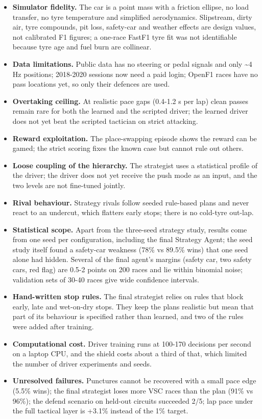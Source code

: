 \documentclass{ieeeaccess}
\providecommand{\tightlist}{\setlength{\itemsep}{0pt}\setlength{\parskip}{0pt}}
\begin{document}
\begin{itemize}
\tightlist
\item
  \textbf{Simulator fidelity.} The car is a point mass with a friction ellipse, no load
  transfer, no tyre temperature and simplified aerodynamics. Slipstream, dirty air,
  tyre compounds, pit loss, safety-car and weather effects are design values, not
  calibrated F1 figures; a one-race FastF1 tyre fit was not identifiable because
  tyre age and fuel burn are collinear.
\item
  \textbf{Data limitations.} Public data has no steering or pedal signals and only
  \textasciitilde4 Hz positions; 2018-2020 sessions now need a paid login; OpenF1 races have no
  pass locations yet, so only their defences are used.
\item
  \textbf{Overtaking ceiling.} At realistic pace gaps (0.4-1.2 s per lap) clean passes
  remain rare for both the learned and the scripted driver; the learned driver does
  not yet beat the scripted tactician on strict attacking.
\item
  \textbf{Reward exploitation.} The place-swapping episode shows the reward can be
  gamed; the strict scoring fixes the known case but cannot rule out others.
\item
  \textbf{Loose coupling of the hierarchy.} The strategist uses a statistical profile
  of the driver; the driver does not yet receive the push mode as an input, and
  the two levels are not fine-tuned jointly.
\item
  \textbf{Rival behaviour.} Strategy rivals follow seeded rule-based plans and never
  react to an undercut, which flatters early stops; there is no cold-tyre out-lap.
\item
  \textbf{Statistical scope.} Apart from the three-seed strategy study, results come
  from one seed per configuration, including the final Strategy Agent; the seed
  study itself found a safety-car weakness (78\% vs 89.5\% wins) that one seed alone
  had hidden. Several of the final agent's margins (safety car, two safety cars,
  red flag) are 0.5-2 points on 200 races and lie within binomial noise;
  validation sets of 30-40 races give wide confidence intervals.
\item
  \textbf{Hand-written stop rules.} The final strategist relies on rules that block
  early, late and wet-on-dry stops. They keep the plans realistic but mean that
  part of its behaviour is specified rather than learned, and two of the rules
  were added after training.
\item
  \textbf{Computational cost.} Driver training runs at 100-170 decisions per second on
  a laptop CPU, and the shield costs about a third of that, which limited the
  number of driver experiments and seeds.
\item
  \textbf{Unresolved failures.} Punctures cannot be recovered with a small pace edge
  (5.5\% wins); the final strategist loses more VSC races than the plan (91\% vs 96\%);
  the defend scenario on held-out circuits succeeded 2/5; lap pace under the full
  tactical layer is +3.1\% instead of the 1\% target.
\end{itemize}
\end{document}
